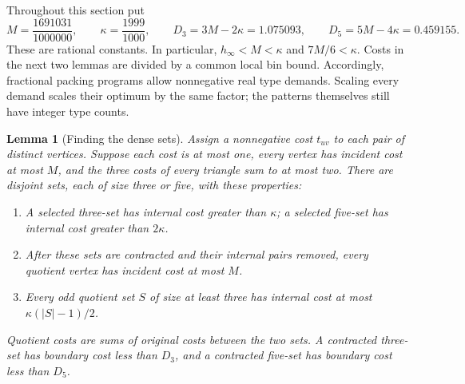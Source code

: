 \documentclass[11pt]{article}
\newtheorem{lemma}[theorem]{Lemma}
\theoremstyle{definition}\newtheorem{algorithm}{Algorithm}[section]
\numberwithin{equation}{section}
\theoremstyle{remark}\newtheorem*{remark}{Remark}
\begin{document}
Throughout this section put
\[
 M=\frac{1691031}{1000000},\qquad
 \kappa=\frac{1999}{1000},\qquad
 D_3=3M-2\kappa=1.075093,\qquad
 D_5=5M-4\kappa=0.459155.
\]
These are rational constants. In particular,
$h_\infty<M<\kappa$ and $7M/6<\kappa$.
Costs in the next two lemmas are divided by a common local bin bound.
Accordingly, fractional packing programs allow nonnegative real type
demands. Scaling every demand scales their optimum by the same factor;
the patterns themselves still have integer type counts.

\begin{lemma}[Finding the dense sets]\label{lem:subtwo-blocks}
Assign a nonnegative cost $t_{uv}$ to each pair of distinct vertices.
Suppose each cost is at most one, every vertex has incident cost at
most $M$, and the three costs of every triangle sum to at most two.
There are disjoint sets, each of size three or five, with these
properties:
\begin{enumerate}[leftmargin=*,itemsep=2pt]
\item A selected three-set has internal cost greater than $\kappa$;
      a selected five-set has internal cost greater than $2\kappa$.
\item After these sets are contracted and their internal pairs removed,
      every quotient vertex has incident cost at most $M$.
\item Every odd quotient set $S$ of size at least three has internal
      cost at most $\kappa(|S|-1)/2$.
\end{enumerate}
Quotient costs are sums of original costs between the two sets. A
contracted three-set has boundary cost less than $D_3$, and a
contracted five-set has boundary cost less than $D_5$.
\end{lemma}
\end{document}
